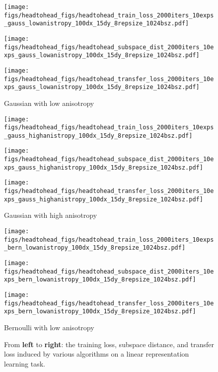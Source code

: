 \begin{figure*}
\centering
\begin{minipage}{0.32\textwidth}
    \centering
    \texttt{[image: figs/headtohead\_figs/headtohead\_train\_loss\_2000iters\_10exps\_gauss\_lowanistropy\_100dx\_15dy\_8repsize\_1024bsz.pdf]}
\end{minipage}%
\begin{minipage}{0.32\textwidth}
    \centering
    \texttt{[image: figs/headtohead\_figs/headtohead\_subspace\_dist\_2000iters\_10exps\_gauss\_lowanistropy\_100dx\_15dy\_8repsize\_1024bsz.pdf]}
\end{minipage}%
\begin{minipage}{0.32\textwidth}
    \centering
    \texttt{[image: figs/headtohead\_figs/headtohead\_transfer\_loss\_2000iters\_10exps\_gauss\_lowanistropy\_100dx\_15dy\_8repsize\_1024bsz.pdf]}
\end{minipage}
\caption{Gaussian with low anisotropy}

\begin{minipage}{0.32\textwidth}
    \centering
    \texttt{[image: figs/headtohead\_figs/headtohead\_train\_loss\_2000iters\_10exps\_gauss\_highanistropy\_100dx\_15dy\_8repsize\_1024bsz.pdf]}
\end{minipage}%
\begin{minipage}{0.32\textwidth}
    \centering
    \texttt{[image: figs/headtohead\_figs/headtohead\_subspace\_dist\_2000iters\_10exps\_gauss\_highanistropy\_100dx\_15dy\_8repsize\_1024bsz.pdf]}
\end{minipage}%
\begin{minipage}{0.32\textwidth}
    \centering
    \texttt{[image: figs/headtohead\_figs/headtohead\_transfer\_loss\_2000iters\_10exps\_gauss\_highanistropy\_100dx\_15dy\_8repsize\_1024bsz.pdf]}
\end{minipage}
\caption{Gaussian with high anisotropy}

\begin{minipage}{0.32\textwidth}
    \centering
    \texttt{[image: figs/headtohead\_figs/headtohead\_train\_loss\_2000iters\_10exps\_bern\_lowanistropy\_100dx\_15dy\_8repsize\_1024bsz.pdf]}
\end{minipage}%
\begin{minipage}{0.32\textwidth}
    \centering
    \texttt{[image: figs/headtohead\_figs/headtohead\_subspace\_dist\_2000iters\_10exps\_bern\_lowanistropy\_100dx\_15dy\_8repsize\_1024bsz.pdf]}
\end{minipage}%
\begin{minipage}{0.32\textwidth}
    \centering
    \texttt{[image: figs/headtohead\_figs/headtohead\_transfer\_loss\_2000iters\_10exps\_bern\_lowanistropy\_100dx\_15dy\_8repsize\_1024bsz.pdf]}
\end{minipage}
\caption{Bernoulli with low anisotropy}

\caption{From \textbf{left} to \textbf{right}: the training loss, subspace distance, and transfer loss induced by various algorithms on a linear representation learning task.}
\label{fig:appendix_headtohead_plots}

\end{figure*}

